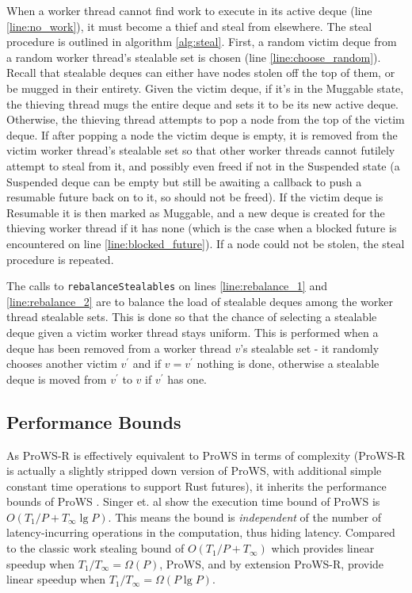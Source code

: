\documentclass[bsc,frontabs,singlespacing,parskip,deptreport,normalheadings]{infthesis}
\begin{document}
When a worker thread cannot find work to execute in its active deque (line
\ref{line:no_work}), it must become a thief and steal from elsewhere. The steal
procedure is outlined in algorithm \ref{alg:steal}. First, a random victim deque
from a random worker thread's stealable set is chosen (line
\ref{line:choose_random}). Recall that stealable deques can either have nodes
stolen off the top of them, or be mugged in their entirety. Given the victim
deque, if it's in the Muggable state, the thieving thread mugs the entire
deque and sets it to be its new active deque. Otherwise, the thieving thread
attempts to pop a node from the top of the victim deque. If after popping a node
the victim deque is empty, it is removed from the victim worker thread's
stealable set so that other worker threads cannot futilely attempt to steal from
it, and possibly even freed if not in the Suspended state (a Suspended deque can
be empty but still be awaiting a callback to push a resumable future back on to
it, so should not be freed). If the victim deque is Resumable it is then marked
as Muggable, and a new deque is created for the thieving worker thread if it has
none (which is the case when a blocked future is encountered on line
\ref{line:blocked_future}). If a node could not be stolen, the steal procedure
is repeated.

The calls to \texttt{rebalanceStealables} on lines \ref{line:rebalance_1} and
\ref{line:rebalance_2} are to balance the load of stealable deques among the
worker thread stealable sets. This is done so that the chance of selecting a
stealable deque given a victim worker thread stays uniform. This is performed
when a deque has been removed from a worker thread \(v\)'s stealable set - it
randomly chooses another victim \(v^\prime\) and if \(v = v^\prime\) nothing is
done, otherwise a stealable deque is moved from \(v^\prime\) to \(v\) if
\(v^\prime\) has one.

\subsection{Performance Bounds}
\label{subsection:performance_bounds}

As ProWS-R is effectively equivalent to ProWS in terms of complexity (ProWS-R is
actually a slightly stripped down version of ProWS, with additional simple
constant time operations to support Rust futures), it inherits the performance
bounds of ProWS \cite{singer_proactive_2019, singer_scheduling_2019}. Singer et.
al show the execution time bound of ProWS is \(O(T_1 / P + T_\infty \lg P)\).
This means the bound is \textit{independent} of the number of latency-incurring operations in
the computation, thus hiding latency. Compared to the classic work stealing
bound of \(O(T_1 / P + T_\infty)\) which provides linear speedup when \(T_1 /
T_\infty = \Omega(P)\), ProWS, and by extension ProWS-R, provide linear speedup
when \(T_1 / T_\infty = \Omega(P \lg P)\).
\end{document}
